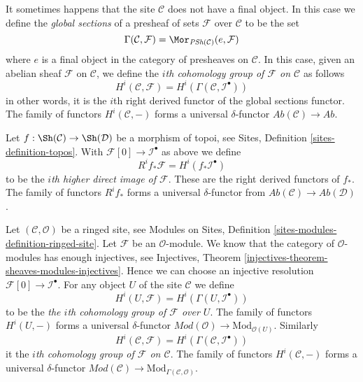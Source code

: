 \medskip\noindent
It sometimes happens that
the site $\mathcal{C}$ does not have a final object. In this
case we define the {\it global sections} of a presheaf
of sets $\mathcal{F}$ over $\mathcal{C}$ to be the set
\begin{equation}
\label{equation-global-sections}
\Gamma(\mathcal{C}, \mathcal{F}) =
\Mor_{\textit{PSh}(\mathcal{C})}(e, \mathcal{F})
\end{equation}
where $e$ is a final object in the category of presheaves on $\mathcal{C}$.
In this case, given an abelian sheaf $\mathcal{F}$ on $\mathcal{C}$,
we define the {\it $i$th cohomology group of $\mathcal{F}$ on $\mathcal{C}$}
as follows
\begin{equation}
\label{equation-cohomology}
H^i(\mathcal{C}, \mathcal{F}) = H^i(\Gamma(\mathcal{C}, \mathcal{I}^\bullet))
\end{equation}
in other words, it is the $i$th right derived functor of the
global sections functor.
The family of functors $H^i(\mathcal{C}, -)$ forms a universal $\delta$-functor
$\textit{Ab}(\mathcal{C}) \to \textit{Ab}$.

\medskip\noindent
Let $f : \Sh(\mathcal{C}) \to \Sh(\mathcal{D})$ be a morphism of topoi, see
Sites, Definition \ref{sites-definition-topos}.
With $\mathcal{F}[0] \to \mathcal{I}^\bullet$ as above
we define
\begin{equation}
\label{equation-higher-direct-image}
R^if_*\mathcal{F} = H^i(f_*\mathcal{I}^\bullet)
\end{equation}
to be the {\it $i$th higher direct image of $\mathcal{F}$}.
These are the right derived functors of $f_*$.
The family of functors $R^if_*$ forms a universal $\delta$-functor
from $\textit{Ab}(\mathcal{C}) \to \textit{Ab}(\mathcal{D})$.

\medskip\noindent
Let $(\mathcal{C}, \mathcal{O})$ be a ringed site, see
Modules on Sites, Definition \ref{sites-modules-definition-ringed-site}.
Let $\mathcal{F}$ be an $\mathcal{O}$-module.
We know that the category of $\mathcal{O}$-modules
has enough injectives, see
Injectives, Theorem \ref{injectives-theorem-sheaves-modules-injectives}.
Hence we can choose an injective resolution
$\mathcal{F}[0] \to \mathcal{I}^\bullet$.
For any object $U$ of the site $\mathcal{C}$ we define
\begin{equation}
\label{equation-cohomology-object-site-modules}
H^i(U, \mathcal{F}) = H^i(\Gamma(U, \mathcal{I}^\bullet))
\end{equation}
to be the {\it the $i$th cohomology group of $\mathcal{F}$ over $U$}.
The family of functors $H^i(U, -)$ forms a universal $\delta$-functor
$\textit{Mod}(\mathcal{O}) \to \text{Mod}_{\mathcal{O}(U)}$. Similarly
\begin{equation}
\label{equation-cohomology-modules}
H^i(\mathcal{C}, \mathcal{F}) = H^i(\Gamma(\mathcal{C}, \mathcal{I}^\bullet))
\end{equation}
it the {\it $i$th cohomology group of $\mathcal{F}$ on $\mathcal{C}$}.
The family of functors $H^i(\mathcal{C}, -)$ forms a universal
$\delta$-functor
$\textit{Mod}(\mathcal{C}) \to \text{Mod}_{\Gamma(\mathcal{C}, \mathcal{O})}$.

